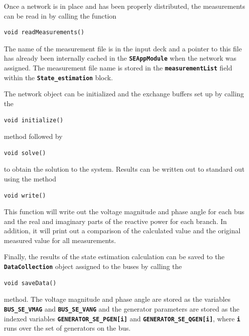 \documentclass[12pt]{report} %
\begin{document}
Once a network is in place and has been properly distributed, the measurements can be read in by calling the function

{
\color{red}
\begin{Verbatim}[fontseries=b]
void readMeasurements()
\end{Verbatim}
}

The name of the measurement file is in the input deck and a pointer to this file has already been internally cached in the \texttt{\textbf{SEAppModule}} when the network was assigned. The measurement file name is stored in the \texttt{\textbf{measurementList}} field within the \texttt{\textbf{State\_estimation}} block.

The network object can be initialized and the exchange buffers set up by calling the

{
\color{red}
\begin{Verbatim}[fontseries=b]
void initialize()
\end{Verbatim}
}

method followed by

{
\color{red}
\begin{Verbatim}[fontseries=b]
void solve()
\end{Verbatim}
}

to obtain the solution to the system. Results can be written out to standard out using the method

{
\color{red}
\begin{Verbatim}[fontseries=b]
void write()
\end{Verbatim}
}

This function will write out the voltage magnitude and phase angle for each bus and the real and imaginary parts of the reactive power for each branch. In addition, it will print out a comparison of the calculated value and the original measured value for all measurements.

Finally, the results of the state estimation calculation can be saved to the \texttt{\textbf{DataCollection}} object assigned to the buses by calling the 

{
\color{red}
\begin{Verbatim}[fontseries=b]
void saveData()
\end{Verbatim}
}

method. The voltage magnitude and phase angle are stored as the variables \texttt{\textbf{BUS\_SE\_VMAG}} and \texttt{\textbf{BUS\_SE\_VANG}} and the generator parameters are stored as the indexed variables \texttt{\textbf{GENERATOR\_SE\_PGEN[i]}} and \texttt{\textbf{GENERATOR\_SE\_QGEN[i]}}, where \texttt{\textbf{i}} runs over the set of generators on the bus.
\end{document}
